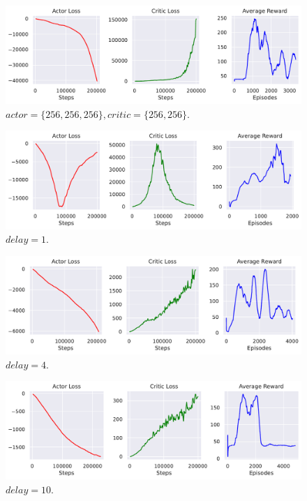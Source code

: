 \begin{figure}[ht]
  \centering
  \includegraphics[width=\linewidth]{images/exp-hopper-Amore.pdf}
  \caption{$actor = \{256, 256, 256\}, critic = \{256, 256\}$.}
\end{figure}

\begin{figure}[ht]
  \centering
  \includegraphics[width=\linewidth]{images/exp-hopper-policy1.pdf}
  \caption{$delay = 1$.}
\end{figure}

\begin{figure}[ht]
  \centering
  \includegraphics[width=\linewidth]{images/exp-hopper-policy4.pdf}
  \caption{$delay = 4$.}
\end{figure}

\begin{figure}[ht]
  \centering
  \includegraphics[width=\linewidth]{images/exp-hopper-policy10.pdf}
  \caption{$delay = 10$.}
\end{figure}

